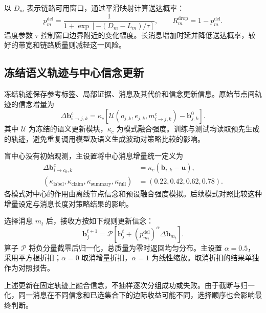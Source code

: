 以 $D_m$ 表示链路可用窗口，通过平滑映射计算送达概率：
\begin{equation}
p_m^{\mathrm{del}}=\frac{1}{1+\exp[-(D_m-L_m)/\tau]},\qquad
R_m^{\mathrm{drop}}=1-p_m^{\mathrm{del}}.
\label{rq2:eq:delivery}
\end{equation}
温度参数 $\tau$ 控制窗口边界附近的变化幅度。长消息增加时延并降低送达概率，较好的带宽和链路质量则减轻这一风险。

\subsection{冻结语义轨迹与中心信念更新}
冻结轨迹保存参考标签、局部证据、消息及其代价和信念更新信息。原始节点间轨迹的信念增量为
\begin{equation}
\Delta\bm b_{i\to j,k}^{c}
=\kappa_c\left[\mathcal U(o_{j,k},e_{j,k},m_{i\to j,k}^{c})-\bm b_{j,k}^{0}\right].
\label{rq2:eq:raw_update}
\end{equation}
其中 $\mathcal U$ 为冻结的语义更新模块，$\kappa_c$ 为模式融合强度。训练与测试均读取预先生成的轨迹，避免重复调用模型及语义生成波动对策略比较的影响。

盲中心没有初始观测，主设置将中心消息增量统一定义为
\begin{equation}
\begin{aligned}
\Delta\bm b_{i\to c_0,k}^{c}&=\kappa_c(\bm b_{i,k}-\bm u),\\
(\kappa_{\mathrm{label}},\kappa_{\mathrm{claim}},\kappa_{\mathrm{summary}},\kappa_{\mathrm{full}})
&=(0.22,0.42,0.62,0.78).
\end{aligned}
\label{rq2:eq:center_update}
\end{equation}
各模式对中心的作用由离线节点信念和预设融合强度模拟。后续模式对照比较这种增量设定与消息长度对策略结果的影响。

选择消息 $m_t$ 后，接收方按如下规则更新信念：
\begin{equation}
\bm b_j^{t+1}=\mathcal P\!\left[\bm b_j^t+
\left(p_{m_t}^{\mathrm{del}}\right)^\alpha\Delta\bm b_{m_t}\right].
\label{rq2:eq:belief_update}
\end{equation}
算子 $\mathcal P$ 将负分量截零后归一化，总质量为零时返回均匀分布。主设置 $\alpha=0.5$，采用平方根折扣；$\alpha=0$ 取消增量折扣，$\alpha=1$ 为线性缩放。取消折扣的结果单独作为对照报告。

上述更新在固定轨迹上融合信念，不抽样逐次分组成功或失败。由于截断与归一化，同一消息在不同信念和已选集合下的边际收益可能不同，选择顺序也会影响最终判断。

\begin{figure}[htbp]
\centering

\label{rq2:fig:workflow}
\end{figure}

